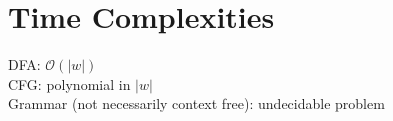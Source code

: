 \section{Time Complexities}
DFA: $\mathcal{O}(|w|)$\\
CFG: polynomial in $|w|$\\
Grammar (not necessarily context free): undecidable problem\\